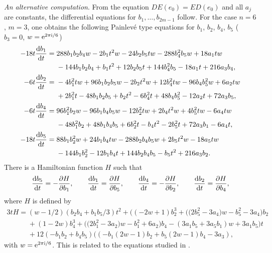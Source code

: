 \documentclass[10pt,a4paper]{amsart}
\numberwithin{equation}{section}
\begin{document}
 {\it An alternative computation}. From the equation $DE(e_0)=ED(e_0)$ and all $a_j$ are constants, the differential equations for $b_1,\dots ,b_{2m-1}$ follow. For the case $n=6$, $m=3$, one obtains the
 following Painlev\'e type equations
 for $b_1$, $b_2$, $b_4$, $b_5$ ($b_3=0$, $w={\rm e}^{2\pi {\rm i}/6}$)
\begin{align*}
-18t\frac{{\rm d}b_1}{{\rm d}t} ={}& 288b_1b_2b_4w - 2b_1t^2w - 24b_2b_5tw - 288b_4^2b_5w + 18a_1tw \\
& - 144b_1b_2b_4
+ b_1t^2 + 12b_2b_5t + 144b_4^2b_5 - 18a_1t + 216a_3b_4,\\
- 6t\frac{{\rm d}b_2}{{\rm d}t} ={}& -4b_1^2tw + 96b_1b_2b_5w - 2b_2t^2w + 12b_4^2tw - 96b_4b_5^2w + 6a_2tw \\
& + 2b_1^2t - 48b_1b_2b_5 + b_2t^2 - 6b_4^2t + 48b_4b_5^2 - 12a_2t + 72a_3b_5, \\
 -6t\frac{{\rm d}b_4}{{\rm d}t} ={}& 96b_1^2b_2w - 96b_1b_4b_5w - 12b_2^2tw +
 2b_4t^2w + 4b_5^2tw - 6a_4tw \\ & - 48b_1^2b_2 + 48b_1b_4b_5 + 6b_2^2t
 - b_4t^2 - 2b_5^2t + 72a_3b_1 - 6a_4t,\\
-18t \frac{{\rm d}b_5}{{\rm d}t} ={}& 88b_1b_2^2w + 24b_1b_4tw - 288b_2b_4b_5w + 2b_5t^2w
 - 18a_5tw \\
 & - 144b_1b_2^2 - 12b_1b_4t + 144b_2b_4b_5
 - b_5t^2 + 216a_3b_2.
 \end{align*}
There is a Hamiltonian function $H$ such that
\[ \frac{{\rm d}b_5}{{\rm d}t}=-\frac{\partial H}{\partial b_1},\qquad \frac{{\rm d}b_1}{{\rm d}t}=\frac{\partial H}{\partial b_5},\qquad \frac{{\rm d}b_4}{{\rm d}t}=-\frac{\partial H}{\partial b_2},\qquad
\frac{{\rm d}b_2}{{\rm d}t}=\frac{\partial H}{\partial b_4},\]
where $H$ is defined by
\begin{gather*}
3tH= (w - 1/2)(b_2b_4 + b_1b_5/3)t^2 + \bigl((-2w + 1)b_2^3 + \bigl(\bigl(2b_5^2 - 3a_4\bigr)w - b_5^2 - 3a_4\bigr)b_2 \\
 \phantom{3tH=}{} + (1-2w)b_4^3
 + \bigl(\bigl(2b_1^2 - 3a_2\bigr)w - b_1^2 + 6a_2\bigr)b_4 - (3a_1b_5 + 3a_5b_1)w + 3a_1b_5\bigr)t \\
 \phantom{3tH=}{}+ 12(-b_1b_2 + b_4b_5)((-b_1(2w - 1)b_2 + b_5(2w - 1)b_4 - 3a_3),
 \end{gather*}
 with $w={\rm e}^{2\pi {\rm i} /6}$. This is related to the equations studied in \cite{H-K-N-S}.
\end{document}

